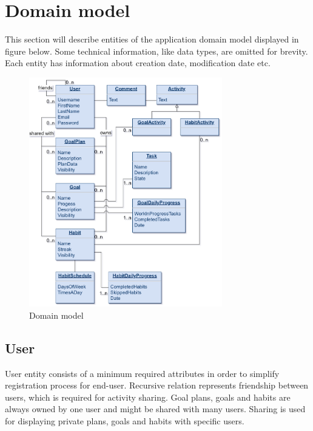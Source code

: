 
\section{Domain model}\label{sec:domain-model}

This section will describe entities of the application domain model displayed in figure below.
Some technical information, like data types, are omitted for brevity.
Each entity has information about creation date, modification date etc.

\begin{figure}[h]
    \includegraphics[width=0.75\textwidth]{images/pda-domain-model.png}
    \caption{Domain model}
    \label{fig:domain-model}
\end{figure}


\subsection{User}\label{subsec:user}

User entity consists of a minimum required attributes in order to simplify registration process for end-user.
Recursive relation represents friendship between users, which is required for activity sharing.
Goal plans, goals and habits are always owned by one user and might be shared with many users.
Sharing is used for displaying private plans, goals and habits with specific users.

